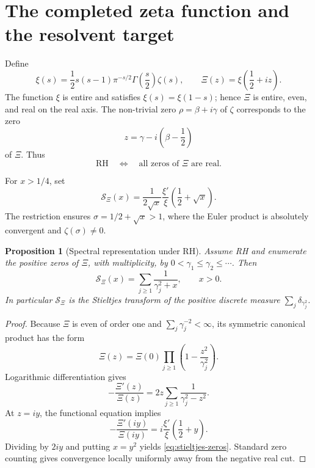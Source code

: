 \documentclass[11pt]{article}
\newtheorem{proposition}[theorem]{Proposition}
\theoremstyle{definition}
\newcommand{\XiR}{\mathcal S_{\Xi}}
\newcommand{\RH}{\mathrm{RH}}
\begin{document}
\section{The completed zeta function and the resolvent target}

Define
\begin{equation}\label{eq:xi-def}
 \xi(s)=\frac12s(s-1)\pi^{-s/2}\Gamma\left(\frac{s}{2}\right)\zeta(s),
 \qquad
 \Xi(z)=\xi\left(\frac12+iz\right).
\end{equation}
The function $\xi$ is entire and satisfies $\xi(s)=\xi(1-s)$; hence $\Xi$ is entire,
even, and real on the real axis. The non-trivial zero $\rho=\beta+i\gamma$ of $\zeta$
corresponds to the zero
\[
 z=\gamma-i\left(\beta-\frac12\right)
\]
of $\Xi$. Thus
\begin{equation}\label{eq:rh-real-zeros}
 \RH\quad\Longleftrightarrow\quad\text{all zeros of $\Xi$ are real}.
\end{equation}

For $x>1/4$, set
\begin{equation}\label{eq:target}
 \XiR(x)=\frac{1}{2\sqrt{x}}\frac{\xi'}{\xi}
 \left(\frac12+\sqrt{x}\right).
\end{equation}
The restriction ensures $\sigma=1/2+\sqrt{x}>1$, where the Euler product is absolutely
convergent and $\zeta(\sigma)\ne0$.

\begin{proposition}[Spectral representation under RH]\label{prop:rh-stieltjes}
Assume RH and enumerate the positive zeros of $\Xi$, with multiplicity, by
$0<\gamma_1\le\gamma_2\le\cdots$. Then
\begin{equation}\label{eq:stieltjes-zeros}
 \XiR(x)=\sum_{j\ge1}\frac{1}{\gamma_j^2+x},\qquad x>0.
\end{equation}
In particular $\XiR$ is the Stieltjes transform of the positive discrete measure
$\sum_j\delta_{\gamma_j^2}$.
\end{proposition}

\begin{proof}
Because $\Xi$ is even of order one and $\sum_j\gamma_j^{-2}<\infty$, its symmetric
canonical product has the form
\[
 \Xi(z)=\Xi(0)\prod_{j\ge1}\left(1-\frac{z^2}{\gamma_j^2}\right).
\]
Logarithmic differentiation gives
\[
 -\frac{\Xi'(z)}{\Xi(z)}=2z\sum_{j\ge1}\frac{1}{\gamma_j^2-z^2}.
\]
At $z=iy$, the functional equation implies
\[
 -\frac{\Xi'(iy)}{\Xi(iy)}
 =i\frac{\xi'}{\xi}\left(\frac12+y\right).
\]
Dividing by $2iy$ and putting $x=y^2$ yields \eqref{eq:stieltjes-zeros}. Standard zero
counting gives convergence locally uniformly away from the negative real cut.
\end{proof}
\end{document}
